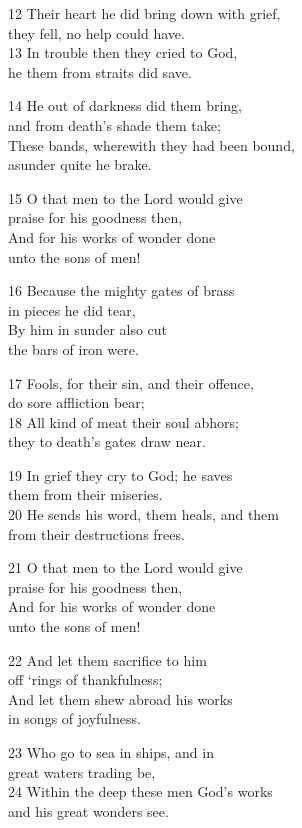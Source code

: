 12 Their heart he did bring down with grief,\\
they fell, no help could have.\\
13 In trouble then they cried to God,\\
he them from straits did save.

14 He out of darkness did them bring,\\
and from death’s shade them take;\\
These bands, wherewith they had been bound,\\
asunder quite he brake.

15 O that men to the Lord would give\\
praise for his goodness then,\\
And for his works of wonder done\\
unto the sons of men!

16 Because the mighty gates of brass\\
in pieces he did tear,\\
By him in sunder also cut\\
the bars of iron were.

17 Fools, for their sin, and their offence,\\
do sore affliction bear;\\
18 All kind of meat their soul abhors;\\
they to death’s gates draw near.

19 In grief they cry to God; he saves\\
them from their miseries.\\
20 He sends his word, them heals, and them\\
from their destructions frees.

21 O that men to the Lord would give\\
praise for his goodness then,\\
And for his works of wonder done\\
unto the sons of men!

22 And let them sacrifice to him\\
off ‘rings of thankfulness;\\
And let them shew abroad his works\\
in songs of joyfulness.

23 Who go to sea in ships, and in\\
great waters trading be,\\
24 Within the deep these men God’s works\\
and his great wonders see.

